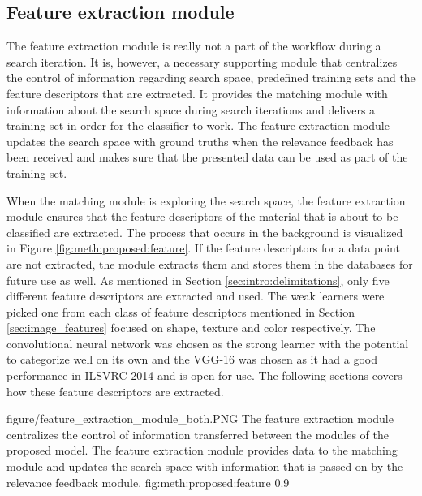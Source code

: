 \subsection{Feature extraction module}
\label{sec:method:proposed:features}
The feature extraction module is really not a part of the workflow during a search iteration. It is, however, a necessary supporting module that centralizes the control of information regarding search space, predefined training sets and the feature descriptors that are extracted. It provides the matching module with information about the search space during search iterations and delivers a training set in order for the classifier to work. The feature extraction module updates the search space with ground truths when the relevance feedback has been received and makes sure that the presented data can be used as part of the training set.

When the matching module is exploring the search space, the feature extraction module ensures that the feature descriptors of the material that is about to be classified are extracted. The process that occurs in the background is visualized in Figure \ref{fig:meth:proposed:feature}. If the feature descriptors for a data point are not extracted, the module extracts them and stores them in the databases for future use as well. As mentioned in Section \ref{sec:intro:delimitations}, only five different feature descriptors are extracted and used. The weak learners were picked one from each class of feature descriptors mentioned in Section \ref{sec:image_features} focused on shape, texture and color respectively. The convolutional neural network was chosen as the strong learner with the potential to categorize well on its own and the VGG-16 was chosen as it had a good performance in ILSVRC-2014 and is open for use. The following sections covers how these feature descriptors are extracted. 


\singlefigure
{figure/feature_extraction_module_both.PNG}
{The feature extraction module centralizes the control of information transferred between the modules of the proposed model. The feature extraction module provides data to the matching module and updates the search space with information that is passed on by the relevance feedback module.}
{fig:meth:proposed:feature}
{0.9}





